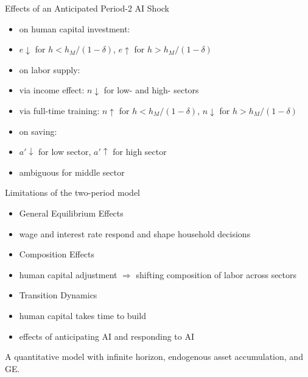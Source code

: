 \documentclass[serif, aspectratio=169]{beamer}
\theoremstyle{remark}
\theoremstyle{plain}
\begin{document}
\begin{frame}{Effects of an Anticipated Period-2 AI Shock}
\begin{itemize}
    \item on human capital investment:
    \item[-] $ e \downarrow$ for $h < h_M/(1-\delta)$, $ e \uparrow$ for $h > h_M/(1-\delta)$
    \medskip
    \item on labor supply:
    \item[-] via income effect: $ n \downarrow$ for low- and high- sectors 
    \item[-] via full-time training: $n \uparrow$ for $h < h_M/(1-\delta)$, $ n \downarrow$ for $h > h_M/(1-\delta)$
    \medskip
    \item on saving:
    \item[-] $ a' \downarrow$ for low sector, $ a' \uparrow$ for high sector
    \item[-] ambiguous for middle sector
    
\end{itemize}
\end{frame}

\begin{frame}{Limitations of the two-period model}

\begin{itemize}
    \item General Equilibrium Effects
    \item[-] wage and interest rate respond and shape household decisions
    \medskip
    \item Composition Effects
    \item[-] human capital adjustment $\Rightarrow$ shifting composition of labor across sectors
    \medskip
    \item Transition Dynamics
    \item[-] human capital takes time to build
    \item[-] effects of anticipating AI and responding to AI
\end{itemize}
\medskip
A quantitative model with infinite horizon, endogenous asset accumulation, and GE. 
\end{frame}
\end{document}
